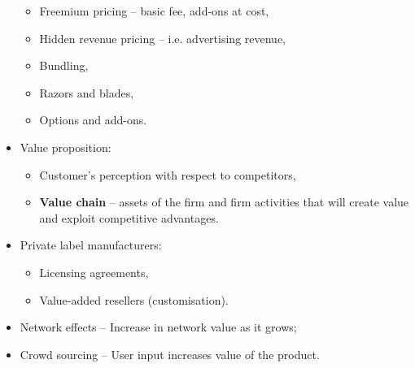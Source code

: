 \documentclass[../notes_compiled.tex]{subfiles}
\begin{document}
\begin{multicols}{2}
\begin{itemize}
\begin{itemize}
\item Freemium pricing -- basic fee, add-ons at cost,
\item Hidden revenue pricing -- i.e. advertising revenue,
\item Bundling,
\item Razors and blades,
\item Options and add-ons.
\end{itemize}
\item Value proposition:
\begin{itemize}
\item Customer's perception with respect to competitors,
\item \textbf{Value chain} -- assets of the firm and firm activities that will create value and exploit competitive advantages.
\end{itemize}
\item Private label manufacturers:
\begin{itemize}
\item Licensing agreements,
\item Value-added resellers (customisation).
\end{itemize}
\item Network effects -- Increase in network value as it grows;
\item Crowd sourcing -- User input increases value of the product.
\end{itemize}
\end{multicols}
\end{document}
